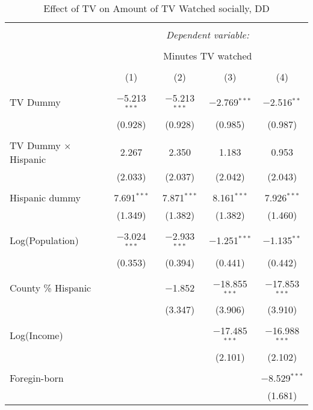 
\begin{table}[!htbp] \centering 
  \caption{Effect of TV on Amount of TV Watched socially, DD} 
  \label{} 
\begin{tabular}{@{\extracolsep{-5pt}}lcccc} 
\\[-1.8ex]\hline 
\hline \\[-1.8ex] 
 & \multicolumn{4}{c}{\textit{Dependent variable:}} \\ 
\cline{2-5} 
\\[-1.8ex] & \multicolumn{4}{c}{Minutes TV watched} \\ 
\\[-1.8ex] & (1) & (2) & (3) & (4)\\ 
\hline \\[-1.8ex] 
 TV Dummy & $-$5.213$^{***}$ & $-$5.213$^{***}$ & $-$2.769$^{***}$ & $-$2.516$^{**}$ \\ 
  & (0.928) & (0.928) & (0.985) & (0.987) \\ 
  & & & & \\ 
 TV Dummy $\times$ Hispanic  & 2.267 & 2.350 & 1.183 & 0.953 \\ 
  & (2.033) & (2.037) & (2.042) & (2.043) \\ 
  & & & & \\ 
 Hispanic dummy & 7.691$^{***}$ & 7.871$^{***}$ & 8.161$^{***}$ & 7.926$^{***}$ \\ 
  & (1.349) & (1.382) & (1.382) & (1.460) \\ 
  & & & & \\ 
 Log(Population) & $-$3.024$^{***}$ & $-$2.933$^{***}$ & $-$1.251$^{***}$ & $-$1.135$^{**}$ \\ 
  & (0.353) & (0.394) & (0.441) & (0.442) \\ 
  & & & & \\ 
 County \% Hispanic &  & $-$1.852 & $-$18.855$^{***}$ & $-$17.853$^{***}$ \\ 
  &  & (3.347) & (3.906) & (3.910) \\ 
  & & & & \\ 
 Log(Income) &  &  & $-$17.485$^{***}$ & $-$16.988$^{***}$ \\ 
  &  &  & (2.101) & (2.102) \\ 
  & & & & \\ 
 Foregin-born &  &  &  & $-$8.529$^{***}$ \\ 
  &  &  &  & (1.681) \\ 

\end{tabular}
\end{table}
